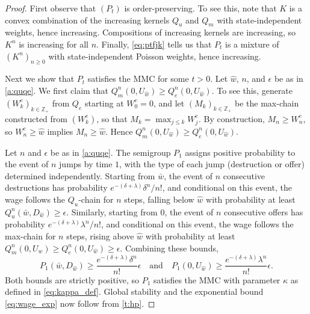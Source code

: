 \documentclass[12pt,reqno]{amsart}
\numberwithin{equation}{section}
\theoremstyle{definition}
\newcommand{\1}{\mathbbm{1}}
\newcommand{\ZZ}{\mathbb{Z}}
\begin{document}
\begin{proof}
    First observe that $(P_t)$ is
    order-preserving. To see this, note that $K$ is a convex combination of the increasing
    kernels $Q_u$ and $Q_m$ with state-independent weights, hence increasing.
    Compositions of increasing kernels are increasing, so $K^n$ is increasing
    for all $n$. Finally, \eqref{eq:ptfjk} tells us that $P_t$ is a mixture of $(K^n)_{n \geq 0}$ with
    state-independent Poisson weights, hence increasing.

    Next we show that $P_t$ satisfies the MMC for some $t > 0$. Let $\hat{w}$,
    $n$, and $\epsilon$ be as in \cref{a:quqe}. We first claim that $Q_{m}^n(0,
    U_{\hat{w}}) \geq Q_e^n(0, U_{\hat{w}})$. To see this, generate
    $(W^e_k)_{k \in \ZZ_+}$ from $Q_e$ starting at $W^e_0 = 0$, and let $(M_k)_{k
    \in \ZZ_+}$ be the max-chain constructed from $(W^e_k)$, so that $M_k = \max_{j
    \leq k} W^e_j$. By construction, $M_n \geq W^e_n$, so $W^e_n \geq \hat{w}$
    implies $M_n \geq \hat{w}$. Hence $Q_{m}^n(0, U_{\hat{w}}) \geq Q_e^n(0,
    U_{\hat{w}})$.

    Let $n$ and $\epsilon$ be as in \cref{a:quqe}. The semigroup $P_1$ assigns
    positive probability to the event of $n$ jumps by time $1$, with the type of
    each jump (destruction or offer) determined independently. Starting from
    $\bar{w}$, the event of $n$ consecutive destructions has probability
    $e^{-(\delta+\lambda)} \delta^n / n!$, and conditional on this event, the
    wage follows the $Q_u$-chain for $n$ steps, falling below $\hat{w}$ with
    probability at least $Q_u^n(\bar{w}, D_{\hat{w}}) \geq \epsilon$.
    Similarly, starting from $0$, the event of $n$ consecutive offers has
    probability $e^{-(\delta+\lambda)} \lambda^n / n!$, and conditional on this
    event, the wage follows the max-chain for $n$ steps, rising above $\hat{w}$
    with probability at least $Q_{m}^n(0, U_{\hat{w}}) \geq Q_{e}^n(0,
    U_{\hat{w}}) \geq \epsilon$. Combining these bounds,
    \begin{equation*}
        P_1(\bar{w}, D_{\hat{w}})
        \geq \frac{e^{-(\delta + \lambda)} \delta^n}{n!} \epsilon
        \quad \text{and} \quad
        P_1(0, U_{\hat{w}})
        \geq \frac{e^{-(\delta + \lambda)} \lambda^n}{n!} \epsilon.
    \end{equation*}
    Both bounds are strictly positive, so $P_1$ satisfies the MMC with parameter
    $\kappa$ as defined in \eqref{eq:kappa_def}. Global stability and
    the exponential bound \eqref{eq:wage_exp} now follow from \cref{t:hp}.
\end{proof}
\end{document}

